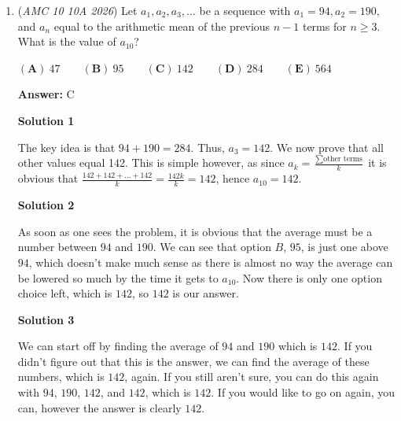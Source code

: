 \begin{enumerate}
\textbf{Solution 5 (Emergency Bashing)}

If any logical solution fails, we could always plug in the values of all answer choices from A-E. Doing so, we see that $150 \times 18 + 190 \times 180 = 180(36 - 2)$, giving us $\fbox{\textbf{(A)}\ 36}$.

 -PointlessTriangle ~minor edits by Squishy64

 Note: the problem where this is linked is covered 2:05-2:35

 


	\item (\textit{AMC 10 10A 2026}) Let $a_1,a_2,a_3,\dots$ be a sequence with $a_1=94, a_2=190,$ and $a_n$ equal to the arithmetic mean of the previous $n-1$ terms for $n\geq 3$. What is the value of $a_{10}$?


 $\mathbf{(A)}~47\qquad\mathbf{(B)}~95\qquad\mathbf{(C)}~142\qquad\mathbf{(D)}~284\qquad\mathbf{(E)}~564$

 \textbf{Answer: }C



\textbf{Solution 1}

The key idea is that $94 + 190 = 284$. Thus, $a_3 = 142$. We now prove that all other values equal 142. This is simple however, as since $a_k = \frac{\sum \text{other terms}}{k}$ it is obvious that $\frac{142 + 142 + \dots + 142}{k} = \frac{142k}{k} = 142$, hence $a_{10} = \boxed{142}$.

 



\textbf{Solution 2}

As soon as one sees the problem, it is obvious that the average must be a number between $94$ and $190$. We can see that option $B$, $95$, is just one above $94$, which doesn't make much sense as there is almost no way the average can be lowered so much by the time it gets to $a_{10}$. Now there is only one option choice left, which is $142$, so $\boxed{142}$ is our answer.

 



\textbf{Solution 3}

We can start off by finding the average of $94$ and $190$ which is $142$. If you didn't figure out that this is the answer, we can find the average of these numbers, which is $142$, again. If you still aren't sure, you can do this again with $94$, $190$, $142$, and $142$, which is $142$. If you would like to go on again, you can, however the answer is clearly $\boxed{142}$.


\end{enumerate}
